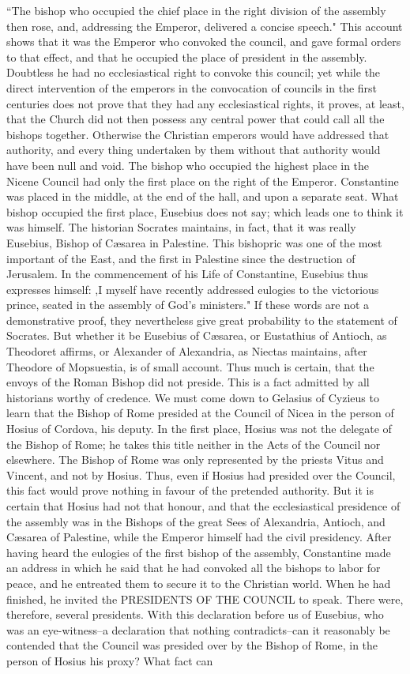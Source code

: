 “The bishop who occupied the chief place in the right division of the assembly then rose, and, addressing the Emperor, delivered a concise speech." This account shows that it was the Emperor who convoked the council, and gave formal orders to that effect, and that he occupied the place of president in the assembly. Doubtless he had no ecclesiastical right to convoke this council; yet while the direct intervention of the emperors in the convocation of councils in the first centuries does not prove that they had any ecclesiastical rights, it proves, at least, that the Church did not then possess any central power that could call all the bishops together. Otherwise the Christian emperors would have addressed that authority, and every thing undertaken by them without that authority would have been null and void. The bishop who occupied the highest place in the Nicene Council had only the first place on the right of the Emperor. Constantine was placed in the middle, at the end of the hall, and upon a separate seat. What bishop occupied the first place, Eusebius does not say; which leads one to think it was himself. The historian Socrates maintains, in fact, that it was really Eusebius, Bishop of Cæsarea in Palestine. This bishopric was one of the most important of the East, and the first in Palestine since the destruction of Jerusalem. In the commencement of his Life of Constantine, Eusebius thus expresses himself: ,I myself have recently addressed eulogies to the victorious prince, seated in the assembly of God's ministers." If these words are not a demonstrative proof, they nevertheless give great probability to the statement of Socrates. But whether it be Eusebius of Cæsarea, or Eustathius of Antioch, as Theodoret affirms, or Alexander of Alexandria, as Niectas maintains, after Theodore of Mopsuestia, is of small account. Thus much is certain, that the envoys of the Roman Bishop did not preside. This is a fact admitted by all historians worthy of credence. We must come down to Gelasius of Cyzieus to learn that the Bishop of Rome presided at the Council of Nicea in the person of Hosius of Cordova, his deputy. In the first place, Hosius was not the delegate of the Bishop of Rome; he takes this title neither in the Acts of the Council nor elsewhere. The Bishop of Rome was only represented by the priests Vitus and Vincent, and not by Hosius. Thus, even if Hosius had presided over the Council, this fact would prove nothing in favour of the pretended authority. But it is certain that Hosius had not that honour, and that the ecclesiastical presidence of the assembly was in the Bishops of the great Sees of Alexandria, Antioch, and Cæsarea of Palestine, while the Emperor himself had the civil presidency. After having heard the eulogies of the first bishop of the assembly, Constantine made an address in which he said that he had convoked all the bishops to labor for peace, and he entreated them to secure it to the Christian world. When he had finished, he invited the PRESIDENTS OF THE COUNCIL to speak. There were, therefore, several presidents. With this declaration before us of Eusebius, who was an eye-witness--a declaration that nothing contradicts--can it reasonably be contended that the Council was presided over by the Bishop of Rome, in the person of Hosius his proxy? What fact can 